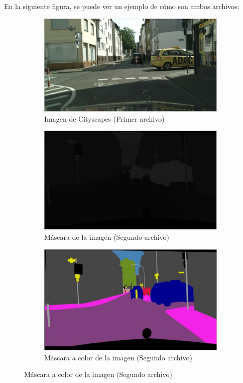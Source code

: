 En la siguiente figura, se puede ver un ejemplo de cómo son ambos archivos:

\begin{figure}[H]
  \centering
    \begin{subfigure}[b]{0.45\linewidth}
    \includegraphics[width=\linewidth]{Figuras/Imagen_Cityscapes.eps}
    \caption{Imagen de Cityscapes (Primer archivo)}
  \end{subfigure}
    \begin{subfigure}[b]{0.45\linewidth}
    \includegraphics[width=\linewidth]{Figuras/Mascara_Cityscapes.eps}
    \caption{Máscara de la imagen (Segundo archivo)}
  \end{subfigure}
      \begin{subfigure}[b]{0.45\linewidth}
    \includegraphics[width=\linewidth]{Figuras/Mascara_Color.eps}
    \caption{Máscara a color de la imagen (Segundo archivo)}
  \end{subfigure}
\end{figure}

